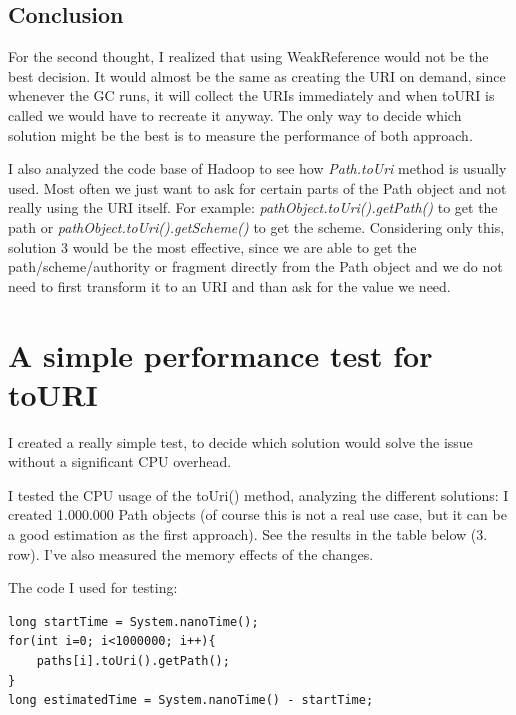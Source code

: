 \subsection{Conclusion}
For the second thought, I realized that using WeakReference would not be the best decision. It would almost be the same as creating the URI on demand, since whenever the GC runs, it will collect the URIs immediately and when toURI is called we would have to recreate it anyway. The only way to decide which solution might be the best is to measure the performance of both approach. 

I also analyzed the code base of Hadoop to see how \textit{Path.toUri} method is usually used. Most often we just want to ask for certain parts of the Path object and not really using the URI itself. For example: \textit{pathObject.toUri().getPath()} to get the path or \textit{pathObject.toUri().getScheme()} to get the scheme. Considering only this, solution 3 would be the most effective, since we are able to get the path/scheme/authority or fragment directly from the Path object and we do not need to first transform it to an URI and than ask for the value we need. 

\section{A simple performance test for toURI}
I created a really simple test, to decide which solution would solve the issue without a significant CPU overhead. 

I tested the CPU usage of the toUri() method, analyzing the different solutions: I created 1.000.000 Path objects (of course this is not a real use case, but it can be a good estimation as the first approach). See the results in the table below (3. row). I’ve also measured the memory effects of the changes. 

\noindent The code I used for testing:
\begin{lstlisting}
long startTime = System.nanoTime();
for(int i=0; i<1000000; i++){
	paths[i].toUri().getPath();
}
long estimatedTime = System.nanoTime() - startTime;
\end{lstlisting}

